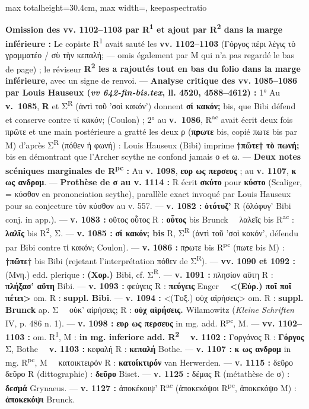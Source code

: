 \documentclass[11pt,twoside]{book}
\newcommand{\italique}[1]{\textit{#1}}
\newcommand{\auDessus}[2]{\leavevmode\vbox{\offinterlineskip\ialign{\hfil##\hfil\cr\fontsize{5.5pt}{6pt}\selectfont #2\cr\noalign{\kern0.1ex}#1\cr}}}
\newcommand{\inRas}[2]{\if\relax\detokenize{#2}\relax\sout{#1}\else\auDessus{\sout{#1}}{#2}\fi}
\newcommand{\expo}[1]{\textsuperscript{#1}}
\newcommand{\R}{\textbf{R}}
\newcommand{\Run}{R\expo{1}}
\newcommand{\Rdeux}{R\expo{2}}
\newcommand{\Rpc}{R\expo{pc}}
\newcommand{\Rac}{R\expo{ac}}
\newcommand{\Mon}{M}
\newcommand{\lecon}[1]{\textbf{#1}}
\newcommand{\espApp}{\ {\color{ruleGold}{\policeFr ∥}}\ }
\begin{document}
\begin{adjustbox}{max totalheight=30.4cm, max width=\textwidth, keepaspectratio}
\begin{minipage}{\textwidth}
{ \textbf{Omission des vv. 1102–1103 par \Run{} et ajout par \Rdeux{} dans la marge inférieure :} Le copiste \Run{} avait sauté les \textbf{vv. 1102–1103} (Γόργος πέρι λέγις τὸ γραμματέο / σὺ τὴν κεπαλή; — omis également par \Mon{} qui n'a pas regardé le bas de page) ; le réviseur \textbf{\Rdeux{} les a rajoutés tout en bas du folio dans la marge inférieure}, avec un signe de renvoi. --- \textbf{Analyse critique des vv. 1085–1086 par Louis Hauseux (\textit{vv 642-fin-bis.tex}, ll. 4520, 4588–4612) :} 1° Au \textbf{v.~1085}, \R{} et {\policeGr Σ}\expo{R} (ἀντὶ τοῦ 'σοὶ κακόν') donnent \lecon{σί κακόν;} bis, que Bibi défend et conserve contre τί κακόν; (Coulon) ; 2° au \textbf{v.~1086}, \Rac{} avait écrit deux fois πρῶτε et une main postérieure a gratté les deux ρ (\lecon{π\inRas{ρ}{}ωτε} bis, copié πωτε bis par \Mon{}) d'après {\policeGr Σ}\expo{R} (πόθεν ἡ φωνή) : Louis Hauseux (Bibi) imprime \lecon{†πῶτε† τὸ πωνή;} bis en démontrant que l'Archer scythe ne confond jamais ο et ω. --- \textbf{Deux notes scéniques marginales de \Rpc{} :} Au \textbf{v. 1098}, \lecon{ευρ\auDessus{ι}{π} ως περσευς} ; au \textbf{v. 1107}, \lecon{κ\auDessus{η}{δ} ως ανδρομ\auDessus{ε}{δ}}. --- \textbf{Prothèse de σ au v. 1114 :} R écrit \lecon{σκύτο} pour \lecon{κύστο} (Scaliger, = κύσθον en prononciation scythe), parallèle exact invoqué par Louis Hauseux pour sa conjecture τὸν κύσθον au v. 557. --- \textbf{v. 1082 :} \lecon{ὀτότυζ'} R (ὀλόφυγ' Bibi conj. in app.). --- \textbf{v. 1083 :} οῦτος οὗτος R : \lecon{οὖτος} bis Brunck \espApp λαλεῖς bis \Rac{} : \lecon{λαλῖς} bis \Rdeux{}, {\policeGr Σ}. --- \textbf{v. 1085 :} \textbf{σί κακόν; bis} R, {\policeGr Σ}\expo{R} (ἀντὶ τοῦ 'σοὶ κακόν', défendu par Bibi contre τί κακόν; Coulon). --- \textbf{v. 1086 :} π\inRas{ρ}{}ωτε bis \Rpc{} (πωτε bis \Mon{}) : \lecon{†πῶτε†} bis Bibi (rejetant l'interprétation πόθεν de {\policeGr Σ}\expo{R}). --- \textbf{vv. 1090 et 1092 :} (Μνη.) edd. plerique : \lecon{(Χορ.)} Bibi, cf. {\policeGr Σ}\expo{R}. --- \textbf{v. 1091 :} πλησίον αὕτη R : \lecon{πλήξασ' αὕτη} Bibi. --- \textbf{v. 1093 :} φεύγεις R : \lecon{πεύγεις} Enger \espApp \lecon{<(Εὐρ.) ποῖ ποῖ πέτει>} om. R : \textbf{suppl. Bibi}. --- \textbf{v. 1094 :} <(Τοξ.) οὐχ αἱρήσεις> om. R : \textbf{suppl. Brunck} ap. {\policeGr Σ} \espApp οὐκ' αἰρήσεις; R : \lecon{οὐχ αἱρήσεις.} Wilamowitz (\italique{Kleine Schriften} IV, p. 486 n. 1). --- \textbf{v. 1098 :} \lecon{ευρ\auDessus{ι}{π} ως περσευς} in mg. add. \Rpc{}, M. --- \textbf{vv. 1102–1103 :} om. \Run{}, M : \textbf{in mg. inferiore add. \Rdeux{}} \espApp \textbf{v. 1102 :} Γοργόνος R : \lecon{Γόργος} {\policeGr Σ}, Bothe \espApp \textbf{v. 1103 :} κεφαλή R : \lecon{κεπαλή} Bothe. --- \textbf{v. 1107 :} \lecon{κ\auDessus{η}{δ} ως ανδρομ\auDessus{ε}{δ}} in mg. \Rpc{}, M \espApp κατοικτειρόν R : \lecon{κατοίκτιρόν} van Herwerden. --- \textbf{v. 1115 :} δεῦρο δεῦρο R (dittographie) : \lecon{δεῦρο} Biset. --- \textbf{v. 1125 :} δέμας R (métathèse de σ) : \lecon{δεσμά} Grynaeus. --- \textbf{v. 1127 :} ἀποκέκοιψ' \Rac{} (ἀποκεκόψοι \Rpc{}, ἀποκεκόψο \Mon{}) : \lecon{ἀποκεκόψι} Brunck.\par}

\end{minipage}
\end{adjustbox}
\end{document}

